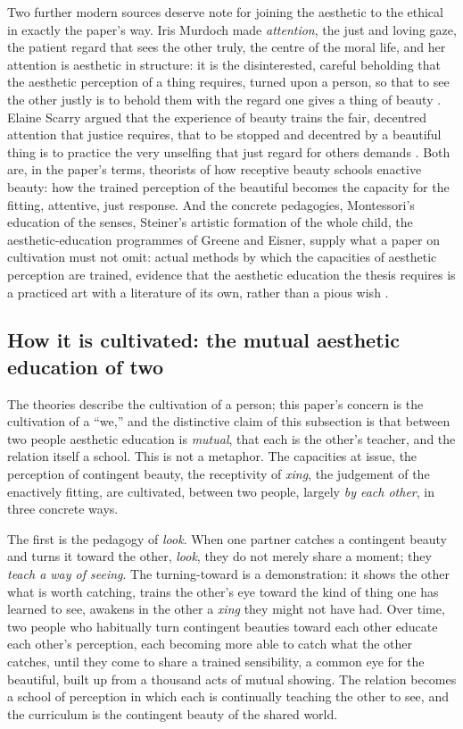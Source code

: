 Two further modern sources deserve note for joining the aesthetic to the ethical in exactly the paper's way. Iris Murdoch made \emph{attention}, the just and loving gaze, the patient regard that sees the other truly, the centre of the moral life, and her attention is aesthetic in structure: it is the disinterested, careful beholding that the aesthetic perception of a thing requires, turned upon a person, so that to see the other justly is to behold them with the regard one gives a thing of beauty \parencite{murdoch1970}. Elaine Scarry argued that the experience of beauty trains the fair, decentred attention that justice requires, that to be stopped and decentred by a beautiful thing is to practice the very unselfing that just regard for others demands \parencite{scarry1999}. Both are, in the paper's terms, theorists of how receptive beauty schools enactive beauty: how the trained perception of the beautiful becomes the capacity for the fitting, attentive, just response. And the concrete pedagogies, Montessori's education of the senses, Steiner's artistic formation of the whole child, the aesthetic-education programmes of Greene and Eisner, supply what a paper on cultivation must not omit: actual methods by which the capacities of aesthetic perception are trained, evidence that the aesthetic education the thesis requires is a practiced art with a literature of its own, rather than a pious wish \parencite{montessori1967,steiner1996,greene2001,eisner2002}.

\subsection{How it is cultivated: the mutual aesthetic education of two}
\label{p21:sub:ae-cultivation}

The theories describe the cultivation of a person; this paper's concern is the cultivation of a ``we,'' and the distinctive claim of this subsection is that between two people aesthetic education is \emph{mutual}, that each is the other's teacher, and the relation itself a school. This is not a metaphor. The capacities at issue, the perception of contingent beauty, the receptivity of \emph{xing}, the judgement of the enactively fitting, are cultivated, between two people, largely \emph{by each other}, in three concrete ways.

The first is the pedagogy of \emph{look}. When one partner catches a contingent beauty and turns it toward the other, \emph{look}, they do not merely share a moment; they \emph{teach a way of seeing}. The turning-toward is a demonstration: it shows the other what is worth catching, trains the other's eye toward the kind of thing one has learned to see, awakens in the other a \emph{xing} they might not have had. Over time, two people who habitually turn contingent beauties toward each other educate each other's perception, each becoming more able to catch what the other catches, until they come to share a trained sensibility, a common eye for the beautiful, built up from a thousand acts of mutual showing. The relation becomes a school of perception in which each is continually teaching the other to see, and the curriculum is the contingent beauty of the shared world.

